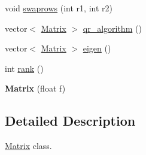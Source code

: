 \begin{DoxyCompactItemize}
\item 
void \hyperlink{classMatrix_a13a0253425eecc6f67fcba76f24e63f3}{swaprows} (int r1, int r2)
\item 
vector$<$ \hyperlink{classMatrix}{Matrix} $>$ \hyperlink{classMatrix_aa043ef91c612666ce8763ad3f28ef232}{qr\-\_\-algorithm} ()
\item 
vector$<$ \hyperlink{classMatrix}{Matrix} $>$ \hyperlink{classMatrix_a8240580696a5c5017f810ce946904730}{eigen} ()
\item 
int \hyperlink{classMatrix_aad7de0b382c1cc4e5a10b2c4ca714f2c}{rank} ()
\item 
\hypertarget{classMatrix_af93a263fe8352046f4dbefbb49f2585f}{{\bfseries Matrix} (float f)}\label{classMatrix_af93a263fe8352046f4dbefbb49f2585f}

\end{DoxyCompactItemize}


\subsection{Detailed Description}
\hyperlink{classMatrix}{Matrix} class. 

